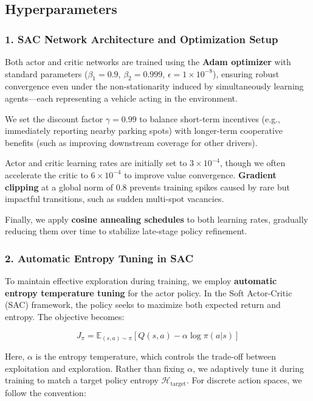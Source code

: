 \subsection{Hyperparameters}
\subsubsection*{1. SAC Network Architecture and Optimization Setup}

Both actor and critic networks are trained using the \textbf{Adam optimizer} with standard parameters (\( \beta_1 = 0.9 \), \( \beta_2 = 0.999 \), \( \epsilon = 1 \times 10^{-8} \)), ensuring robust convergence even under the non-stationarity induced by simultaneously learning agents—each representing a vehicle acting in the environment. 

We set the discount factor \( \gamma = 0.99 \) to balance short-term incentives (e.g., immediately reporting nearby parking spots) with longer-term cooperative benefits (such as improving downstream coverage for other drivers). 

Actor and critic learning rates are initially set to \( 3 \times 10^{-4} \), though we often accelerate the critic to \( 6 \times 10^{-4} \) to improve value convergence. \textbf{Gradient clipping} at a global norm of 0.8 prevents training spikes caused by rare but impactful transitions, such as sudden multi-spot vacancies. 

Finally, we apply \textbf{cosine annealing schedules} to both learning rates, gradually reducing them over time to stabilize late-stage policy refinement.

\vspace{1em}

\subsubsection*{2. Automatic Entropy Tuning in SAC}

To maintain effective exploration during training, we employ \textbf{automatic entropy temperature tuning} for the actor policy. In the Soft Actor-Critic (SAC) framework, the policy seeks to maximize both expected return and entropy. The objective becomes:

\[
J_\pi = \mathbb{E}_{(s, a) \sim \pi} \left[ Q(s, a) - \alpha \log \pi(a|s) \right]
\]

Here, \( \alpha \) is the entropy temperature, which controls the trade-off between exploitation and exploration. Rather than fixing \( \alpha \), we adaptively tune it during training to match a target policy entropy \( \mathcal{H}_{\text{target}} \). For discrete action spaces, we follow the convention:

